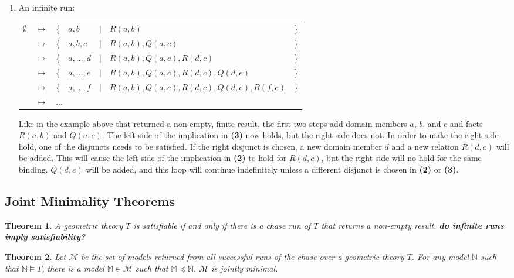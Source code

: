 \begin{enumerate}
		\item An infinite run:

			\begin{tabular}{lllllll}
				$\emptyset$ & $\mapsto$ & \{ & $a,b$        & $|$ & $R(a,b)$                                 & \} \\
				{}          & $\mapsto$ & \{ & $a,b,c$      & $|$ & $R(a,b), Q(a,c)$                         & \} \\
				{}          & $\mapsto$ & \{ & $a,\ldots,d$ & $|$ & $R(a,b), Q(a,c), R(d,c)$                 & \} \\
				{}          & $\mapsto$ & \{ & $a,\ldots,e$ & $|$ & $R(a,b), Q(a,c), R(d,c), Q(d,e)$         & \} \\
				{}          & $\mapsto$ & \{ & $a,\ldots,f$ & $|$ & $R(a,b), Q(a,c), R(d,c), Q(d,e), R(f,e)$ & \} \\
				{}          & $\mapsto$ & \multicolumn{5}{l}{ $\ldots$ }                                          \\
			\end{tabular}

			Like in the example above that returned a non-empty, finite result,
			the first two steps add domain members $a$, $b$, and $c$ and facts
			$R(a,b)$ and $Q(a,c)$. The left side of the implication in
			\textbf{(3)} now holds, but the right side does not. In order to
			make the right side hold, one of the disjuncts needs to be
			satisfied. If the right disjunct is chosen, a new domain member $d$
			and a new relation $R(d,c)$ will be added.  This will cause the
			left side of the implication in \textbf{(2)} to hold for $R(d,c)$,
			but the right side will no hold for the same binding. $Q(d,e)$ will
			be added, and this loop will continue indefinitely unless a
			different disjunct is chosen in \textbf{(2)} or \textbf{(3)}.

		\end{enumerate}

	\subsection{Joint Minimality Theorems}

		\newtheorem{minimality-theorems}{Theorem}

		\begin{minimality-theorems}
			A geometric theory $T$ is satisfiable if and only if there is a
			chase run of $T$ that returns a non-empty result.
			\textbf{ do infinite runs imply satisfiability? }
		\end{minimality-theorems}

		\begin{minimality-theorems}
			Let $\mathcal{M}$ be the set of models returned from all successful
			runs of the chase over a geometric theory $T$. For any model
			$\mathbb{N}$ such that $\mathbb{N} \models T$, there is a model
			$\mathbb{M} \in \mathcal{M}$ such that $\mathbb{M} \preceq
			\mathbb{N}$. $\mathcal{M}$ is jointly minimal.
		\end{minimality-theorems}
